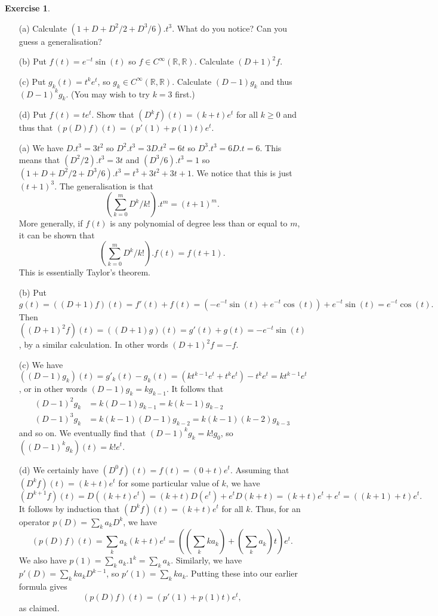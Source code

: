 \documentclass{amsart}
\newcommand{\R}         {{\mathbb{R}}}
\newcommand{\CRR}       {C^\infty(\R,\R)}
\newcommand{\ip}[1]     {\langle #1\rangle}
\renewcommand{\:}{\colon}
\theoremstyle{definition}
\newtheorem{exercise}{Exercise}[section]
\renewenvironment{solution}{\SolutionAtEnd}{\endSolutionAtEnd}
\begin{document}
\begin{exercise}
 \begin{itemize}
  \item[(a)] Calculate $(1+D+D^2/2+D^3/6).t^3$.  What do you notice?
   Can you guess a generalisation?
  \item[(b)] Put $f(t)=e^{-t}\sin(t)$ so $f\in\CRR$.  Calculate
   $(D+1)^2f$. 
  \item[(c)] Put $g_k(t)=t^ke^t$, so $g_k\in\CRR$.  Calculate
   $(D-1)g_k$ and thus $(D-1)^kg_k$.  (You may wish to try $k=3$
   first.)
  \item[(d)] Put $f(t)=te^t$.  Show that $(D^kf)(t)=(k+t)e^t$ for all
   $k\geq 0$ and thus that $(p(D)f)(t)=(p'(1)+p(1)t)e^t$.
 \end{itemize}
\end{exercise}
\begin{solution}
 \begin{itemize}
 \item[(a)] We have $D.t^3=3t^2$ so $D^2.t^3=3D.t^2=6t$ so
  $D^3.t^3=6D.t=6$.  This means that $(D^2/2).t^3=3t$ and
  $(D^3/6).t^3=1$ so $(1+D+D^2/2+D^3/6).t^3=t^3+3t^2+3t+1$.  We notice
  that this is just $(t+1)^3$.  The generalisation is that 
  \[ (\sum_{k=0}^m D^k/k!).t^m = (t+1)^m. \]
  More generally, if $f(t)$ is any polynomial of degree less than or
  equal to $m$, it can be shown that 
  \[ (\sum_{k=0}^m D^k/k!).f(t) = f(t+1). \]
  This is essentially Taylor's theorem.
 \item[(b)] Put 
  \[ g(t)=((D+1)f)(t)=f'(t)+f(t)=
       (-e^{-t}\sin(t)+e^{-t}\cos(t))+e^{-t}\sin(t)=e^{-t}\cos(t).
  \]
  Then $((D+1)^2f)(t)=((D+1)g)(t)=g'(t)+g(t)=-e^{-t}\sin(t)$, by a
  similar calculation.  In other words $(D+1)^2f=-f$.
 \item[(c)] We have
  $((D-1)g_k)(t)=g'_k(t)-g_k(t)=(kt^{k-1}e^t+t^ke^t)-t^ke^t=kt^{k-1}e^t$,
  or in other words $(D-1)g_k=kg_{k-1}$.  It follows that
  \begin{align*}
   (D-1)^2g_k &= k(D-1)g_{k-1}=k(k-1)g_{k-2} \\
   (D-1)^3g_k &= k(k-1)(D-1)g_{k-2}=k(k-1)(k-2)g_{k-3}
  \end{align*}
  and so on.  We eventually find that $(D-1)^kg_k=k!g_0$, so
  $((D-1)^kg_k)(t)=k!e^t$.  
 \item[(d)] We certainly have $(D^0f)(t)=f(t)=(0+t)e^t$.  Assuming
  that $(D^kf)(t)=(k+t)e^t$ for some particular value of $k$, we have
  \[ (D^{k+1}f)(t) = D((k+t)e^t)= (k+t) D(e^t) + e^t D(k+t) = 
      (k+t) e^t + e^t = ((k+1) + t) e^t.
  \]
  It follows by induction that $(D^kf)(t)=(k+t)e^t$ for all $k$.
  Thus, for an operator $p(D)=\sum_k a_kD^k$, we have
  \[ (p(D)f)(t) = \sum_k a_k(k+t) e^t =
       ((\sum_k ka_k) + (\sum_k a_k)t) e^t.
  \]
  We also have $p(1)=\sum_k a_k.1^k=\sum_ka_k$.  Similarly, we have 
  $p'(D)=\sum_k ka_k D^{k-1}$, so $p'(1)=\sum_k ka_k$.  Putting these
  into our earlier formula gives
  \[ (p(D)f)(t) = (p'(1) + p(1)t) e^t, \]
  as claimed.
 \end{itemize}
\end{solution}
\end{document}
